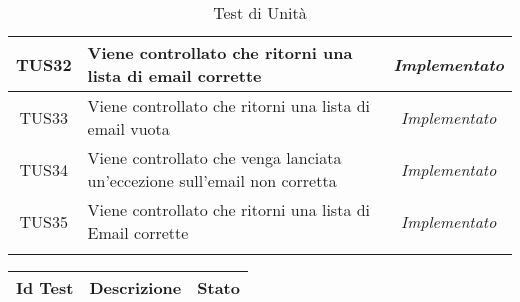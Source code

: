 \begin{longtable}{|c|m{12em}|c|}
TUS32 & Viene controllato che ritorni una lista di email corrette & \textit{Implementato}\\ \hline
TUS33 & Viene controllato che ritorni una lista di email vuota & \textit{Implementato}\\ \hline
TUS34 & Viene controllato che venga lanciata un'eccezione sull'email non corretta & \textit{Implementato}\\ \hline
TUS35 & Viene controllato che ritorni una lista di Email corrette & \textit{Implementato}\\ \hline
\caption[Test di Unità]{Test di Unità}
\label{tabella:test2}
\end{longtable}
\clearpage

\normalsize
\begin{longtable}{|c|m{12em}|c|}
\hline 
\textbf{Id Test} & \textbf{Descrizione}  & \textbf{Stato}\\
\hline
\endhead


\end{longtable}
